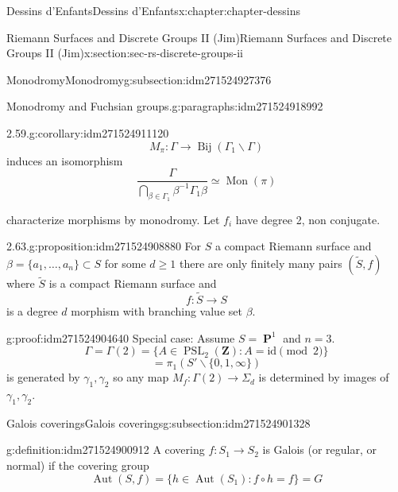 \documentclass[oneside,10pt,]{book}
\numberwithin{equation}{section}
\newcommand{\inv}{^{-1}}
\newcommand{\ZZ}{\mathbf{Z}}
\newcommand{\id}{\mathrm{id}}
\DeclareMathOperator{\PP}{\mathbf{P}}
\DeclareMathOperator{\Aut}{Aut}
\DeclareMathOperator{\PSL}{PSL}
\begin{document}
\begin{chapterptx}{Dessins d'Enfants}{}{Dessins d'Enfants}{}{}{x:chapter:chapter-dessins}
\begin{sectionptx}{Riemann Surfaces and Discrete Groups II (Jim)}{}{Riemann Surfaces and Discrete Groups II (Jim)}{}{}{x:section:sec-rs-discrete-groups-ii}
\begin{subsectionptx}{Monodromy}{}{Monodromy}{}{}{g:subsection:idm271524927376}
\begin{paragraphs}{Monodromy and Fuchsian groups.}{g:paragraphs:idm271524918992}
\begin{corollary}{2.59.}{}{g:corollary:idm271524911120}%
%
\begin{equation*}
M_\pi \colon \Gamma \to \operatorname{Bij} (\Gamma_1 \backslash \Gamma)
\end{equation*}
induces an isomorphism%
\begin{equation*}
\frac{\Gamma}{\bigcap_{\beta\in \Gamma_1} \beta\inv \Gamma_1 \beta} \simeq \operatorname{Mon}(\pi)
\end{equation*}
%
\end{corollary}
characterize morphisms by monodromy. Let \(f_i\) have degree 2, non conjugate.%
\begin{proposition}{2.63.}{}{g:proposition:idm271524908880}%
For \(S\) a compact Riemann surface and \(\beta = \{ a_1, \ldots, a_n\} \subset S\) for some \(d \ge 1\) there are only finitely many pairs \((\tilde S, f)\) where \(\tilde S\) is a compact Riemann surface and%
\begin{equation*}
f\colon \tilde S \to S
\end{equation*}
is a degree \(d\) morphism with branching  value set \(\beta\).%
\end{proposition}
\begin{proofptx}{}{g:proof:idm271524904640}
Special case: Assume \(S = \PP^1\) and \(n=3\).%
\begin{equation*}
\Gamma = \Gamma(2) = \{ A \in \PSL_2(\ZZ) : A = \id \pmod 2\}
\end{equation*}
%
\begin{equation*}
= \pi_1 (S' \smallsetminus \{0,1,\infty\})
\end{equation*}
is generated by \(\gamma_1, \gamma_2\) so any map \(M_f \colon \Gamma(2) \to \Sigma_d\) is determined by  images of \(\gamma_1, \gamma_2\).%
\end{proofptx}
\end{paragraphs}%
\end{subsectionptx}
%
%
\typeout{************************************************}
\typeout{************************************************}
%
\begin{subsectionptx}{Galois coverings}{}{Galois coverings}{}{}{g:subsection:idm271524901328}
\begin{definition}{}{g:definition:idm271524900912}%
A covering \(f\colon S_1\to S_2\) is Galois (or regular, or normal) if the covering group%
\begin{equation*}
\Aut(S,f) =  \{ h\in \Aut(S_1) : f\circ h= f\} = G

\end{equation*}
\end{definition}
\end{subsectionptx}
\end{sectionptx}
\end{chapterptx}
\end{document}
